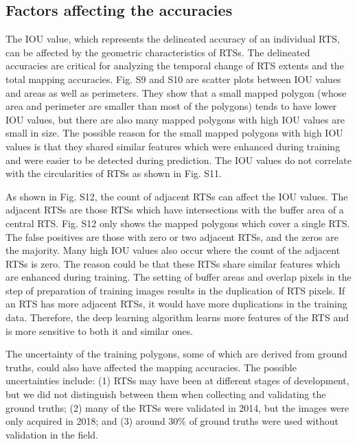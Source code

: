\documentclass[authoryear,preprint,review,12pt]{elsarticle}
\begin{document}
\subsection{Factors affecting the accuracies}
\label{subsec_acc_factors}

The IOU value, which represents the delineated accuracy of an individual RTS, can be affected by the geometric characteristics of RTSs.
The delineated accuracies are critical for analyzing the temporal change of RTS extents and the total mapping accuracies.
Fig. S9 and S10 are scatter plots between IOU values and areas as well as perimeters. They show that a small mapped polygon (whose area and perimeter are smaller than most of the polygons) tends to have lower IOU values, but there are also many mapped polygons with high IOU values are small in size. 
The possible reason for the small mapped polygons with high IOU values is that they shared similar features which were enhanced during training and were easier to be detected during prediction.
The IOU values do not correlate with the circularities of RTSs as shown in Fig. S11. 


As shown in Fig. S12, the count of adjacent RTSs can affect the IOU values. The adjacent RTSs are those RTSs which have intersections with the buffer area of a central RTS. Fig. S12 only shows the mapped polygons which cover a single RTS. The false positives are those with zero or two adjacent RTSs, and the zeros are the majority. Many high IOU values also occur where the count of the adjacent RTSs is zero. The reason could be that these RTSs share similar features which are enhanced during training. The setting of buffer areas and overlap pixels in the step of preparation of training images results in the duplication of RTS pixels. If an RTS has more adjacent RTSs, it would have more duplications in the training data. Therefore, the deep learning algorithm learns more features of the RTS and is more sensitive to both it and similar ones. 

The uncertainty of the training polygons, some of which are derived from ground truths, could also have affected the mapping accuracies. The possible uncertainties include: (1) RTSs may have been at different stages of development, but we did not distinguish between them when collecting and validating the ground truths; (2) many of the RTSs were validated in 2014, but the images were only acquired in 2018; and (3) around 30\% of ground truths were used without validation in the field. 
\end{document}
